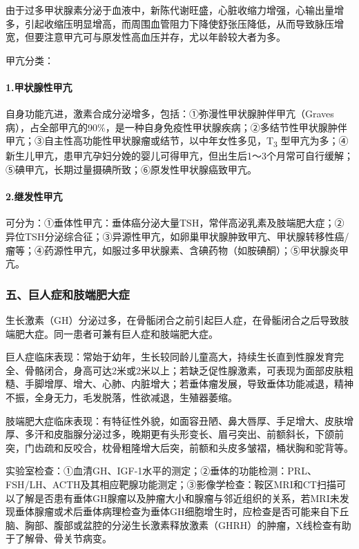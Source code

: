 由于过多甲状腺素分泌于血液中，新陈代谢旺盛，心脏收缩力增强，心输出量增多，引起收缩压明显增高，而周围血管阻力下降使舒张压降低，从而导致脉压增宽，但要注意甲亢可与原发性高血压并存，尤以年龄较大者为多。

甲亢分类：

\paragraph{1.甲状腺性甲亢}

自身功能亢进，激素合成分泌增多，包括：①弥漫性甲状腺肿伴甲亢（Graves病），占全部甲亢的90\%，是一种自身免疫性甲状腺疾病；②多结节性甲状腺肿伴甲亢；③自主性高功能性甲状腺瘤或结节，以中年女性多见，T\textsubscript{3}
型甲亢为多；④新生儿甲亢，患甲亢孕妇分娩的婴儿可得甲亢，但出生后1～3个月常可自行缓解；⑤碘甲亢，长期过量摄碘所致；⑥原发性甲状腺癌致甲亢。

\paragraph{2.继发性甲亢}

可分为：①垂体性甲亢：垂体癌分泌大量TSH，常伴高泌乳素及肢端肥大症；②异位TSH分泌综合征；③异源性甲亢，如卵巢甲状腺肿致甲亢、甲状腺转移性癌/瘤等；④药源性甲亢，如服过多甲状腺素、含碘药物（如胺碘酮）；⑤甲状腺炎甲亢。

\subsubsection{五、巨人症和肢端肥大症}

生长激素（GH）分泌过多，在骨骺闭合之前引起巨人症，在骨骺闭合之后导致肢端肥大症。同一患者可兼有巨人症和肢端肥大症。

巨人症临床表现：常始于幼年，生长较同龄儿童高大，持续生长直到性腺发育完全、骨骼闭合，身高可达2米或2米以上；若缺乏促性腺激素，可表现为面部皮肤粗糙、手脚增厚、增大、心肺、内脏增大；若垂体瘤发展，导致垂体功能减退，精神不振，全身无力，毛发脱落，性欲减退，生殖器萎缩。

肢端肥大症临床表现：有特征性外貌，如面容丑陋、鼻大唇厚、手足增大、皮肤增厚、多汗和皮脂腺分泌过多，晚期更有头形变长、眉弓突出、前额斜长，下颌前突，门齿疏和反咬合，枕骨粗隆增大后突，前额和头皮多皱褶，桶状胸和驼背等。

实验室检查：①血清GH、IGF-1水平的测定；②垂体的功能检测：PRL、FSH/LH、ACTH及其相应靶腺功能测定；③影像学检查：鞍区MRI和CT扫描可以了解是否患有垂体GH腺瘤以及肿瘤大小和腺瘤与邻近组织的关系，若MRI未发现垂体腺瘤或术后垂体病理检查为垂体GH细胞增生时，应检查是否可能来自下丘脑、胸部、腹部或盆腔的分泌生长激素释放激素（GHRH）的肿瘤，X线检查有助于了解骨、骨关节病变。

